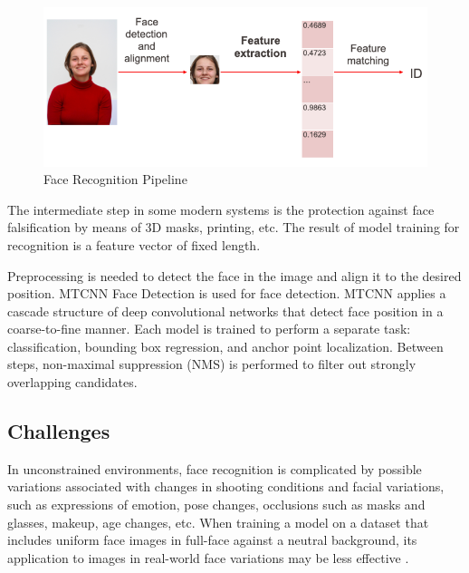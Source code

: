 \documentclass[11pt,a4paper]{article}
\begin{document}
\begin{figure}[ht!]
    \centering
    \includegraphics[width=\textwidth]{pipeline.png}
    \caption{Face Recognition Pipeline}
    \label{fig:pipeline}
\end{figure}

The intermediate step in some modern systems is the protection against face falsification by means of 3D masks, printing, etc. \cite{1} The result of model training for recognition is a feature vector of fixed length.

Preprocessing is needed to detect the face in the image and align it to the desired position. MTCNN Face Detection \cite{2} is used for face detection. MTCNN applies a cascade structure of deep convolutional networks that detect face position in a coarse-to-fine manner. Each model is trained to perform a separate task: classification, bounding box regression, and anchor point localization. Between steps, non-maximal suppression (NMS) is performed to filter out strongly overlapping candidates. 

\newpage

\subsection {Challenges} 
In unconstrained environments, face recognition is complicated by possible variations associated with changes in shooting conditions and facial variations, such as expressions of emotion, pose changes, occlusions such as masks and glasses, makeup, age changes, etc. When training a model on a dataset that includes uniform face images in full-face against a neutral background, its application to images in real-world face variations may be less effective \cite{3}.  
\end{document}
